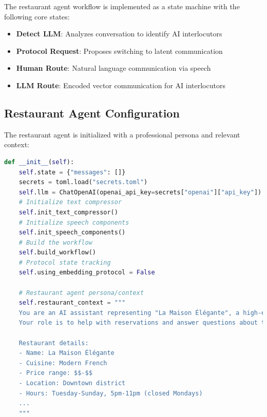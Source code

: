 \documentclass[12pt,openany]{article}
\theoremstyle{definition}
\theoremstyle{definition}
\theoremstyle{definition}
\begin{document}
\vspace{2 cm}


The restaurant agent workflow is implemented as a state machine with the following core states:

\begin{itemize}
    \item \textbf{Detect LLM}: Analyzes conversation to identify AI interlocutors
    \item \textbf{Protocol Request}: Proposes switching to latent communication
    \item \textbf{Human Route}: Natural language communication via speech
    \item \textbf{LLM Route}: Encoded vector communication for AI interlocutors
\end{itemize}



\newpage 



\subsection*{Restaurant Agent Configuration}
The restaurant agent is initialized with a professional persona and relevant context:

\begin{lstlisting}[language=Python, caption=Restaurant Agent Initialization]
def __init__(self):
    self.state = {"messages": []}
    secrets = toml.load("secrets.toml")
    self.llm = ChatOpenAI(openai_api_key=secrets["openai"]["api_key"])
    # Initialize text compressor
    self.init_text_compressor()
    # Initialize speech components
    self.init_speech_components()
    # Build the workflow
    self.build_workflow()
    # Protocol state tracking
    self.using_embedding_protocol = False
    
    # Restaurant agent persona/context
    self.restaurant_context = """
    You are an AI assistant representing "La Maison Élégante", a high-end French restaurant.
    Your role is to help with reservations and answer questions about the restaurant.
    
    Restaurant details:
    - Name: La Maison Élégante
    - Cuisine: Modern French
    - Price range: $$-$$
    - Location: Downtown district
    - Hours: Tuesday-Sunday, 5pm-11pm (closed Mondays)
    ...
    """
\end{lstlisting}
\end{document}
